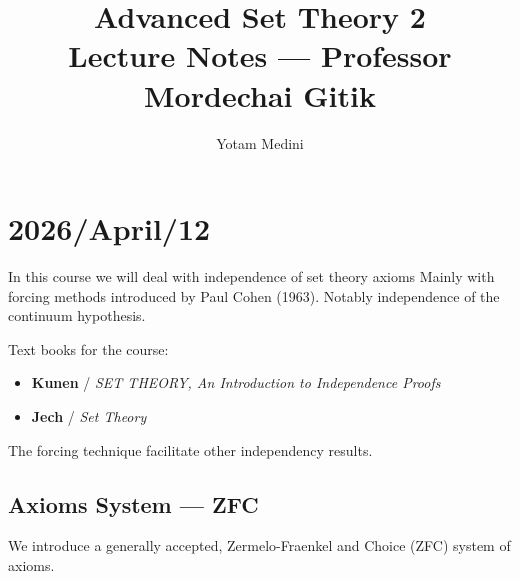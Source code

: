 \documentclass[11pt,pdftex,twoside,a4paper]{article}
\title{Advanced Set Theory 2
          \\
       Lecture Notes --- Professor Mordechai Gitik}
\author{Yotam Medini}
\newcommand{\B}[1]{\textbf{#1}}
\theoremstyle{definition}
\begin{document}
\maketitle
\newpage
\tableofcontents
\newpage

\section{2026/April/12}

In this course we will deal with independence of set theory axioms
Mainly with forcing methods introduced by Paul Cohen (1963).
Notably independence of the continuum hypothesis.

Text books for the course:
\begin{itemize}
  \item \B{Kunen} / \textit{SET THEORY,
    An Introduction to Independence Proofs}
  \item \B{Jech} / \textit{Set Theory}
\end{itemize}

The forcing technique facilitate other independency results.

\subsection{Axioms System --- ZFC}

We introduce a generally accepted, Zermelo-Fraenkel and Choice
(ZFC) system of axioms.
\end{document}
